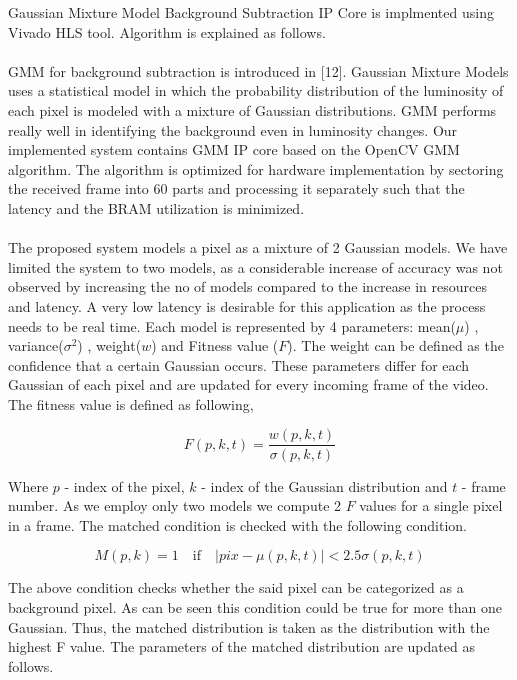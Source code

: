 \documentclass[12pt,a4paper]{report}
\begin{document}
Gaussian Mixture Model Background Subtraction IP Core is implmented using Vivado HLS tool. Algorithm is explained as follows.\\\\ GMM for background subtraction is introduced in [12].
Gaussian Mixture Models uses a statistical model in which the probability distribution of the luminosity of each pixel is modeled with a mixture of Gaussian distributions. GMM performs really well in identifying the background even in luminosity changes. Our implemented system contains GMM IP core based on the OpenCV GMM algorithm.  The algorithm is optimized for hardware implementation by sectoring the received frame into 60 parts and processing it separately such that the latency and the BRAM utilization is minimized.\\\\
The proposed system models a pixel as a mixture of 2 Gaussian models. We have limited the system to two models, as a considerable increase of accuracy was not observed by increasing the no of models compared to the increase in resources and latency. A very low latency is desirable for this application as the process needs to be real time. Each model is represented by 4 parameters: mean($\mu$) , variance($\sigma^2$) , weight($w$) and Fitness value ($F$). The weight can be defined as the confidence that a certain Gaussian occurs. These parameters differ for each Gaussian of each pixel and are updated for every incoming frame of the video.\\
The fitness value is defined as following,

\begin{equation}
F(p,k,t)=\frac{w(p,k,t)}{\sigma(p,k,t)}
\end{equation}

Where $p$ - index of the pixel, $k$ - index of the Gaussian distribution and $t$ - frame number. As we employ only two models we compute 2 $F$ values for a single pixel in a frame. The matched condition is checked with the following condition. 

\begin{equation}
M(p,k)=1 \quad \textrm{if}  \quad |pix- \mu(p,k,t)| < 2.5\sigma(p,k,t)
\end{equation}

The above condition checks whether the said pixel can be categorized as a background pixel. As can be seen this condition could be true for more than one Gaussian. Thus, the matched distribution is taken as the distribution with the highest F value. The parameters of the matched distribution are updated as follows. 
\end{document}
